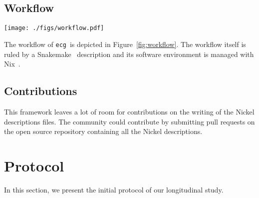 \documentclass[sigconf,natbib=false]{acmart}
\newcommand{\df}{\texttt{Dockerfile}}
\newcommand{\ecg}{\texttt{ecg}}
\newcommand{\todo}[1]{{\color{red}{TODO: #1}}}
\begin{document}
\subsection{Workflow}\label{sec:workflow}

\begin{figure*}
  \centering
  \texttt{[image: ./figs/workflow.pdf]}
  \caption{
    Workflow of \ecg.
    Each description of an artifact is verified with the Nickel contract and then converted in a JSON representation.
    This JSON representation is then read by \ecg\ to
    \textit{(i)} download the artifact,
    \textit{(ii)} compute the hash of its content,
    \textit{(iii)} build the container from the \df, and
    \textit{(iv)} extract the software environment information from the built container.
    \ecg\ outputs files containing the information about the artifact and its \df\ .
  }
  \label{fig:workflow}
\end{figure*}

The workflow of \ecg\ is depicted in Figure~\ref{fig:workflow}.
The workflow itself \cite{ecg_workflow} is ruled by a Snakemake~\cite{koster2012snakemake} description and its software environment \cite{ecg_nix} is managed with Nix~\cite{dolstra_nix_2004}.

\subsection{Contributions}

This framework leaves a lot of room for contributions on the writing of the Nickel descriptions files.
The community could contribute by submitting pull requests on the open source repository containing all the Nickel descriptions.
\todo{more}

\section{Protocol}\label{sec:protocol}

In this section, we present the initial protocol of our longitudinal study.
\end{document}
